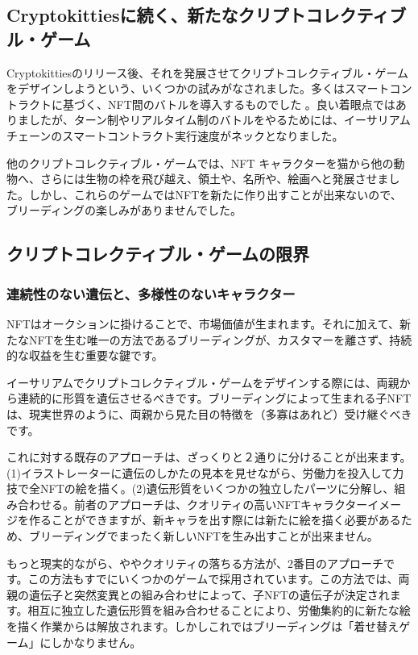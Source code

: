 \documentclass[xelatex,ja=standard]{bxjsarticle}
\begin{document}
\subsection{Cryptokittiesに続く、新たなクリプトコレクティブル・ゲーム}

Cryptokittiesのリリース後、それを発展させてクリプトコレクティブル・ゲームをデザインしようという、いくつかの試みがなされました。多くはスマートコントラクトに基づく、NFT間のバトルを導入するものでした\cite{cryptofighters,fishbank,cryptomons,etheremon} 。良い着眼点ではありましたが、ターン制やリアルタイム制のバトルをやるためには、イーサリアムチェーンのスマートコントラクト実行速度がネックとなりました。

他のクリプトコレクティブル・ゲームでは、NFT キャラクターを猫から他の動物へ、さらには生物の枠を飛び越え、領土や、名所や、絵画へと発展させました。しかし、これらのゲームではNFTを新たに作り出すことが出来ないので、ブリーディングの楽しみがありませんでした。

\subsection{クリプトコレクティブル・ゲームの限界}
\subsubsection{連続性のない遺伝と、多様性のないキャラクター}

NFTはオークションに掛けることで、市場価値が生まれます。それに加えて、新たなNFTを生む唯一の方法であるブリーディングが、カスタマーを離さず、持続的な収益を生む重要な鍵です。

イーサリアムでクリプトコレクティブル・ゲームをデザインする際には、両親から連続的に形質を遺伝させるべきです。ブリーディングによって生まれる子NFTは、現実世界のように、両親から見た目の特徴を（多寡はあれど）受け継ぐべきです。

これに対する既存のアプローチは、ざっくりと２通りに分けることが出来ます。(1)イラストレーターに遺伝のしかたの見本を見せながら、労働力を投入して力技で全NFTの絵を描く。(2)遺伝形質をいくつかの独立したパーツに分解し、組み合わせる。前者のアプローチは、クオリティの高いNFTキャラクターイメージを作ることができますが、新キャラを出す際には新たに絵を描く必要があるため、ブリーディングでまったく新しいNFTを生み出すことが出来ません。

もっと現実的ながら、ややクオリティの落ちる方法が、2番目のアプローチです。この方法もすでにいくつかのゲームで採用されています。この方法では、両親の遺伝子と突然変異との組み合わせによって、子NFTの遺伝子が決定されます。相互に独立した遺伝形質を組み合わせることにより、労働集約的に新たな絵を描く作業からは解放されます\cite{cryptokitties,etherwaifu,cryptofighters}。しかしこれではブリーディングは「着せ替えゲーム」にしかなりません。
\end{document}
